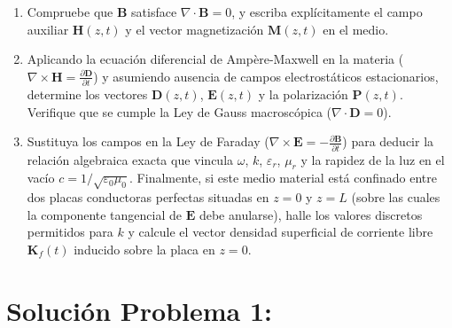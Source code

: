 \documentclass[11pt]{article}
\begin{document}
\begin{enumerate}
    \item[a)] Compruebe que $\mathbf{B}$ satisface $\nabla \cdot \mathbf{B} = 0$, y escriba explícitamente el campo auxiliar $\mathbf{H}(z,t)$ y el vector magnetización $\mathbf{M}(z,t)$ en el medio.
    \item[b)] Aplicando la ecuación diferencial de Ampère-Maxwell en la materia ($\nabla \times \mathbf{H} = \frac{\partial \mathbf{D}}{\partial t}$) y asumiendo ausencia de campos electrostáticos estacionarios, determine los vectores $\mathbf{D}(z,t)$, $\mathbf{E}(z,t)$ y la polarización $\mathbf{P}(z,t)$. Verifique que se cumple la Ley de Gauss macroscópica ($\nabla \cdot \mathbf{D} = 0$).
    \item[c)] Sustituya los campos en la Ley de Faraday ($\nabla \times \mathbf{E} = -\frac{\partial \mathbf{B}}{\partial t}$) para deducir la relación algebraica exacta que vincula $\omega$, $k$, $\varepsilon_r$, $\mu_r$ y la rapidez de la luz en el vacío $c = 1/\sqrt{\varepsilon_0 \mu_0}$. Finalmente, si este medio material está confinado entre dos placas conductoras perfectas situadas en $z = 0$ y $z = L$ (sobre las cuales la componente tangencial de $\mathbf{E}$ debe anularse), halle los valores discretos permitidos para $k$ y calcule el vector densidad superficial de corriente libre $\mathbf{K}_f(t)$ inducido sobre la placa en $z = 0$.
\end{enumerate}

\newpage

\section*{Solución Problema 1:}
\end{document}
